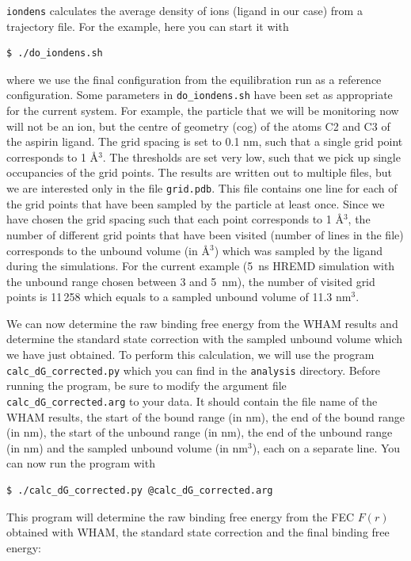 \texttt{iondens} calculates the average density of ions (ligand in our case) from a trajectory file.
For the example, here you can start it with
\begin{lstlisting}
$ ./do_iondens.sh 
\end{lstlisting}
where we use the final configuration from the equilibration run as a reference configuration. 
Some parameters in \texttt{do\_iondens.sh} have been set as appropriate for the current system.
For example, the particle that we will be monitoring now will not be an ion, but the centre of geometry (cog) of the atoms C2 and C3 of the aspirin ligand.
The grid spacing is set to 0.1 nm, such that a single grid point corresponds to 1 \AA$^3$.
The thresholds are set very low, such that we pick up single occupancies of the grid points.
The results are written out to multiple files, but we are interested only in the file \texttt{grid.pdb}.
This file contains one line for each of the grid points that have been sampled by the particle at least once. 
Since we have chosen the grid spacing such that each point corresponds to 1 \AA$^3$, the number of different grid points that have been visited (number of lines in the file) corresponds to the unbound volume (in \AA$^3$) which was sampled by the ligand during the simulations. 
For the current example (5~ns HREMD simulation with the unbound range chosen between 3 and 5~nm), the number of visited grid points is 11\,258 which equals to a sampled unbound volume of 11.3 nm$^3$.


We can now determine the raw binding free energy from the WHAM results and determine the standard state correction with the sampled unbound volume which we have just obtained.
To perform this calculation, we will use the program \texttt{calc\_dG\_corrected.py} which you can find in the \texttt{analysis} directory. 
Before running the program, be sure to modify the argument file \texttt{calc\_dG\_corrected.arg} to your data.
It should contain the file name of the WHAM results, the start of the bound range (in nm), the end of the bound range (in nm), the start of the unbound range (in nm), the end of the unbound range (in nm) and the sampled unbound volume (in nm$^3$), each on a separate line. 
You can now run the program with
\begin{lstlisting}
$ ./calc_dG_corrected.py @calc_dG_corrected.arg
\end{lstlisting}
%
This program will determine the raw binding free energy from the FEC $F(r)$  obtained with WHAM, the standard state correction and the final binding free energy:

